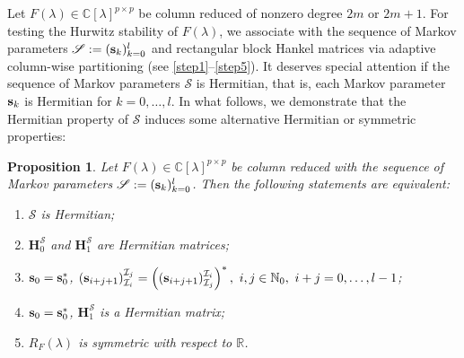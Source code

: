 \documentclass[12pt,reqno]{amsart}
\theoremstyle{plain}
\newtheorem{proposition}[theorem]{Proposition}
\numberwithin{equation}{section}
\theoremstyle{remark}
\begin{document}
Let $F(\lambda)\in\mathbb C[\lambda]^{p\times p}$ be column reduced of nonzero degree $2m$ or $2m+1$. For testing the Hurwitz stability of $F(\lambda)$, we associate with the sequence of Markov parameters $\mathscr S:=({\bf s}_{k})_{k=0}^{l}$ and rectangular block Hankel matrices via adaptive column-wise partitioning (see \ref{step1}--\ref{step5}).  It deserves special attention if the sequence of Markov parameters
    $\mathscr S$  is Hermitian, that is,  each Markov parameter ${\bf s}_k$ is Hermitian for $k= 0,\ldots,l$.
In what follows, we demonstrate that the Hermitian property of   $\mathscr S$ induces some alternative  Hermitian or symmetric properties:
\begin{proposition}\label{ProSelfAdjoint}
 Let $F(\lambda)\in\mathbb C[\lambda]^{p\times p}$ be column reduced with the sequence of Markov parameters
$\mathscr S:=({\bf s}_{k})_{k=0}^{l}$. Then the following statements are equivalent:
\begin{enumerate}
\item[{\rm (i)}] $\mathscr S$ is Hermitian;
\item[{\rm (ii)}] $\mathbf{H}_{0}^{\mathscr S}$ and $\mathbf{H}_{1}^{\mathscr S}$ are Hermitian matrices;
\item[{\rm (iii)}]
${\bf s}_0={\bf s}_0^*$, $({\bf s}_{i+j+1})_{\mathcal I_i}^{\mathcal I_j}=\left(({\bf s}_{i+j+1})_{\mathcal I_j}^{\mathcal I_i}\right)^*,\ i,j\in \mathbb N_0,\ i+j=0,\ldots,l-1$;
\item[{\rm (iv)}]
  ${\bf s}_0={\bf s}_0^*$, $\mathbf{H}_{1}^{\mathscr S}$ is a Hermitian matrix; 
\item[{\rm (v)}] $R_F(\lambda)$ is symmetric with respect to $\mathbb R$.
\end{enumerate}
 \end{proposition}
\end{document}
